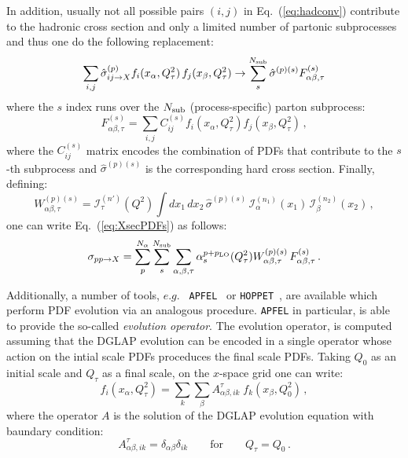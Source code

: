 \documentclass[preprint,12pt]{elsarticle}
\begin{document}
In addition, usually not all possible pairs $(i,j)$ in
Eq.~(\ref{eq:hadconv}) contribute to the hadronic cross section and
only a limited number of partonic subprocesses and thus one do the
following replacement:
\begin{equation}
\sum_{i,j} \hat{\sigma}^{(p)}_{ij\to X}
f_i(x_\alpha,Q_\tau^2)\,f_j(x_\beta,Q_\tau^2)\rightarrow
\sum_{s}^{N_{\rm sub}} \hat{\sigma}^{(p)(s)} F^{(s)}_{\alpha\beta,\tau}
\end{equation}
where the $s$ index runs over the $N_{\rm sub}$ (process-specific)
parton subprocess:
\begin{equation}\label{eq:APPLsubproc}
  F^{(s)}_{\alpha\beta,\tau} =\sum_{i,j} C^{(s)}_{ij} 
  f_i(x_{\alpha},Q^2_\tau)f_j(x_{\beta},Q^2_\tau)\,,
\end{equation}
where the $C^{(s)}_{ij}$ matrix encodes the combination of PDFs that
contribute to the $s$-th subprocess and $\hat{\sigma}^{(p)(s)}$
is the corresponding hard cross section. Finally, defining:
\begin{equation}
  W_{\alpha\beta,\tau}^{(p)(s)} = \mathcal{I}_\tau^{(n')}(Q^2)\int dx_1\,dx_2\,
  \hat{\sigma}^{(p)(s)}\,\mathcal{I}_\alpha^{(n_1)}(x_1)
  \,\mathcal{I}_\beta^{(n_2)}(x_2)\,,
\end{equation}
one can write Eq.~(\ref{eq:XsecPDFs}) as follows:
\begin{equation} \label{eq:applconv}
  \sigma_{pp\to X} = \sum_p^{N_\alpha} \sum_{s}^{N_{\mathrm{sub}}} \sum_{\alpha,\beta,\tau} 
  \alpha_s^{p+p_{\rm LO}}(Q^2_\tau)W_{\alpha\beta,\tau}^{(p)(s)} \, F_{\alpha\beta,\tau}^{(s)}\,.
\end{equation}

Additionally, a number of tools, $e.g.$ {\tt
  APFEL}~\cite{Bertone:2013vaa} or {\tt HOPPET}~\cite{Salam:2008qg},
are available which perform PDF evolution via an analogous
procedure. {\tt APFEL} in particular, is able to provide the so-called
\textit{evolution operator}. The evolution operator, is computed
assuming that the DGLAP evolution can be encoded in a single operator
whose action on the intial scale PDFs proceduces the final scale
PDFs. Taking $Q_0$ as an initial scale and $Q_\tau$ as a final scale,
on the $x$-space grid one can write:
\begin{equation}\label{eq:fastPDFfinal_recalled}
  f_i(x_{\alpha},Q^2_\tau) = \sum_{k}
  \sum_\beta A^\tau_{\alpha\beta, ik}\;
  f_k(x_\beta,Q^2_0)\,, 
\end{equation}
where the operator $A$ is the solution of the DGLAP evolution
equation with baundary condition:
\begin{equation}
A^\tau_{\alpha\beta, ik} =
\delta_{\alpha\beta}\delta_{ik}\qquad\mbox{for}\qquad Q_\tau = Q_0\,.
\end{equation}
\end{document}
